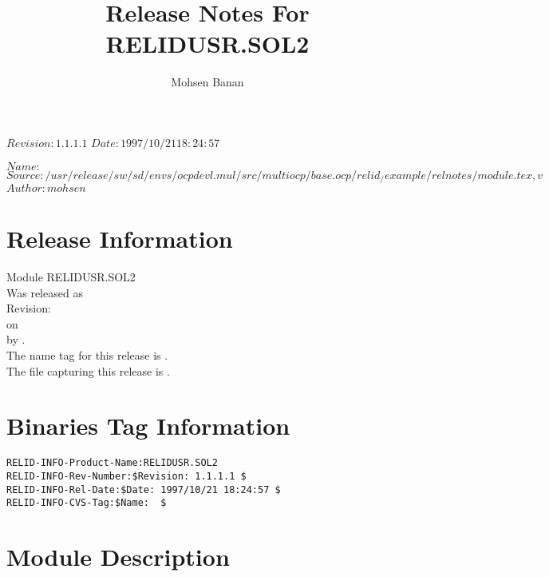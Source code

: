 


\def\RcsEmptyValue{$\rm \langle Unknown \rangle$}
\RCSdef $Revision: 1.1.1.1 $
\RCSdef $Date: 1997/10/21 18:24:57 $

\RCSdef $Name:  $
\RCSdef $Source: /usr/release/sw/sd/envs/ocpdevl.mul/src/multiocp/base.ocp/relid_/example/relnotes/module.tex,v $
\RCSdef $Author: mohsen $





\author{Mohsen Banan}

\date{\RCSDate}

\title{Release Notes For RELIDUSR.SOL2}


\maketitle

\section*{Release Information} 

  Module RELIDUSR.SOL2 \\
  Was released as \\
  {Revision: \RCSRevision} \\
  on \RCSDate \\
  by \RCSAuthor. \\
  The name tag for this release is \RCSName. \\
  The file capturing this release is \RCSSource. \\

\section*{Binaries Tag Information} 

\begin{verbatim}
RELID-INFO-Product-Name:RELIDUSR.SOL2
RELID-INFO-Rev-Number:$Revision: 1.1.1.1 $
RELID-INFO-Rel-Date:$Date: 1997/10/21 18:24:57 $
RELID-INFO-CVS-Tag:$Name:  $
\end{verbatim}


\section*{Module Description} 

